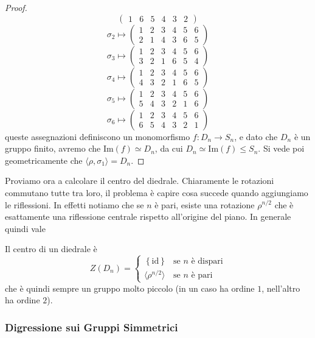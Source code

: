 \documentclass[11pt]{scrartcl}
\newcommand{\Immagine}[1]{\text{Im}\!\left(#1\right)}
\begin{document}
\begin{proof}
$$\begin{pmatrix}
			1 & 6 & 5 & 4 & 3 & 2
		\end{pmatrix}
		$$
		$$\sigma_2 \mapsto 
		\begin{pmatrix}
			1 & 2 & 3 & 4 & 5 & 6 \\
			2 & 1 & 4 & 3 & 6 & 5
		\end{pmatrix}
		$$
		$$\sigma_3 \mapsto 
		\begin{pmatrix}
			1 & 2 & 3 & 4 & 5 & 6 \\
			3 & 2 & 1 & 6 & 5 & 4
		\end{pmatrix}
		$$
		$$\sigma_4 \mapsto 
		\begin{pmatrix}
			1 & 2 & 3 & 4 & 5 & 6 \\
			4 & 3 & 2 & 1 & 6 & 5
		\end{pmatrix}
		$$
		$$\sigma_5 \mapsto 
		\begin{pmatrix}
			1 & 2 & 3 & 4 & 5 & 6 \\
			5 & 4 & 3 & 2 & 1 & 6
		\end{pmatrix}
		$$
		$$\sigma_6 \mapsto 
		\begin{pmatrix}
			1 & 2 & 3 & 4 & 5 & 6 \\
			6 & 5 & 4 & 3 & 2 & 1
		\end{pmatrix}
		$$
		queste assegnazioni definiscono un monomorfismo $f:D_n\to S_n$, e dato che $D_n$ è un gruppo finito, avremo che $\Immagine{f}\simeq D_n$, da cui $D_n\simeq\Immagine{f}\le S_n$. Si vede poi geometricamente che $\langle \rho, \sigma_1\rangle=D_n$.
	\end{proof}
	Proviamo ora a calcolare il centro del diedrale. Chiaramente le rotazioni commutano tutte tra loro, il problema è capire cosa succede quando aggiungiamo le riflessioni. In effetti notiamo che se $n$ è pari, esiste una rotazione $\rho^{n/2}$ che è esattamente una riflessione centrale rispetto all'origine del piano. In generale quindi vale
	\begin{lemma}
		Il centro di un diedrale è
		$$
		Z(D_n)=
		\begin{cases}
			\left\{\text{id}\right\} & \text{se $n$ è dispari} \\
			\langle \rho^{n/2}\rangle & \text{se $n$ è pari}
 		\end{cases}
		$$
		che è quindi sempre un gruppo molto piccolo (in un caso ha ordine $1$, nell'altro ha ordine $2$).
	\end{lemma}
	
	
	\subsubsection{Digressione sui Gruppi Simmetrici}
	
\end{document}

